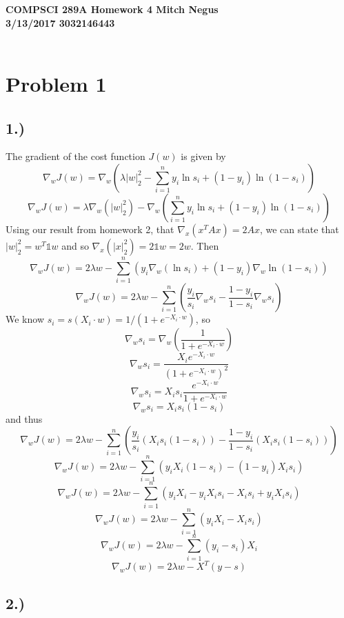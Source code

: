 \documentclass{report}
\begin{document}
\thispagestyle{empty}

{\bf {\large {COMPSCI 289A} Homework {4} \hfill Mitch Negus\\
		3/13/2017 						\hfill	3032146443}}\\\\


\section*{Problem 1}

\subsection*{1.)}

The gradient of the cost function $J(w)$ is given by
$$ \nabla_w J(w) = \nabla_w \left( \lambda |w|_2^2 - \sum_{i=1}^n{ y_i \ln s_i + (1-y_i) \ln (1-s_i)} \right) $$
$$ \nabla_w J(w) = \lambda \nabla_w(|w|_2^2) - \nabla_w \left(  \sum_{i=1}^n{ y_i \ln s_i + (1-y_i) \ln (1-s_i)} \right) $$
Using our result from homework 2, that $\nabla_x (x^TAx) = 2Ax$, we can state that $|w|_2^2 = w^T\mathbb{1}w$ and so $\nabla_x(|x|_2^2) = 2\mathbb{1}w = 2w$. Then
$$ \nabla_w J(w) = 2 \lambda w - \sum_{i=1}^n{\left( y_i  \nabla_w (\ln s_i )+ (1-y_i) \nabla_w \ln (1-s_i) \right)}$$
$$ \nabla_w J(w) = 2 \lambda w - \sum_{i=1}^n{\left( \frac{y_i}{s_i}\nabla_w s_i - \frac{1-y_i}{1-s_i} \nabla_w s_i \right)} $$
We know $s_i = s(X_i \cdot w) = 1/(1 + e^{-X_i \cdot w})$, so 
$$ \nabla_w s_i = \nabla_w \left( \frac{1}{1 + e^{-X_i \cdot w}} \right) $$
$$ \nabla_w s_i = \frac{X_i e^{-X_i \cdot w}}{(1 + e^{-X_i \cdot w})^2} $$
$$ \nabla_w s_i = X_i s_i \frac{e^{-X_i \cdot w}}{1 + e^{-X_i \cdot w}} $$
$$ \nabla_w s_i = X_i s_i (1-s_i) $$
and thus 
$$ \nabla_w J(w) = 2 \lambda w - \sum_{i=1}^n{\left( \frac{y_i}{s_i}(X_i s_i (1-s_i)) - \frac{1-y_i}{1-s_i} (X_i s_i (1-s_i)) \right)} $$
$$ \nabla_w J(w) = 2 \lambda w - \sum_{i=1}^n{\left( y_i X_i (1-s_i) - (1-y_i) X_i s_i  \right)} $$
$$ \nabla_w J(w) = 2 \lambda w - \sum_{i=1}^n{\left( y_i X_i - y_i X_i s_i  - X_i s_i + y_i X_i s_i \right)} $$
$$ \nabla_w J(w) = 2 \lambda w - \sum_{i=1}^n{\left( y_i X_i - X_i s_i \right)} $$
$$ \nabla_w J(w) = 2 \lambda w - \sum_{i=1}^n{\left( y_i - s_i \right)X_i} $$
$$\boxed{ \nabla_w J(w) = 2 \lambda w - X^T(y-s) }$$


\subsection*{2.)}
\end{document}
